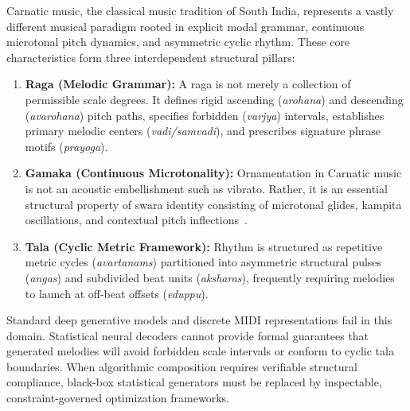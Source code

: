 \documentclass[12pt,a4paper]{report}
\begin{document}
Carnatic music, the classical music tradition of South India, represents a vastly different musical paradigm rooted in explicit modal grammar, continuous microtonal pitch dynamics, and asymmetric cyclic rhythm. These core characteristics form three interdependent structural pillars:
\begin{enumerate}
    \item \textbf{Raga (Melodic Grammar):} A raga is not merely a collection of permissible scale degrees. It defines rigid ascending (\textit{arohana}) and descending (\textit{avarohana}) pitch paths, specifies forbidden (\textit{varjya}) intervals, establishes primary melodic centers (\textit{vadi/samvadi}), and prescribes signature phrase motifs (\textit{prayoga}).
    \item \textbf{Gamaka (Continuous Microtonality):} Ornamentation in Carnatic music is not an acoustic embellishment such as vibrato. Rather, it is an essential structural property of swara identity consisting of microtonal glides, kampita oscillations, and contextual pitch inflections~\cite{gamaka2022}.
    \item \textbf{Tala (Cyclic Metric Framework):} Rhythm is structured as repetitive metric cycles (\textit{avartanams}) partitioned into asymmetric structural pulses (\textit{angas}) and subdivided beat units (\textit{aksharas}), frequently requiring melodies to launch at off-beat offsets (\textit{eduppu}).
\end{enumerate}

Standard deep generative models and discrete MIDI representations fail in this domain. Statistical neural decoders cannot provide formal guarantees that generated melodies will avoid forbidden scale intervals or conform to cyclic tala boundaries. When algorithmic composition requires verifiable structural compliance, black-box statistical generators must be replaced by inspectable, constraint-governed optimization frameworks.
\end{document}
